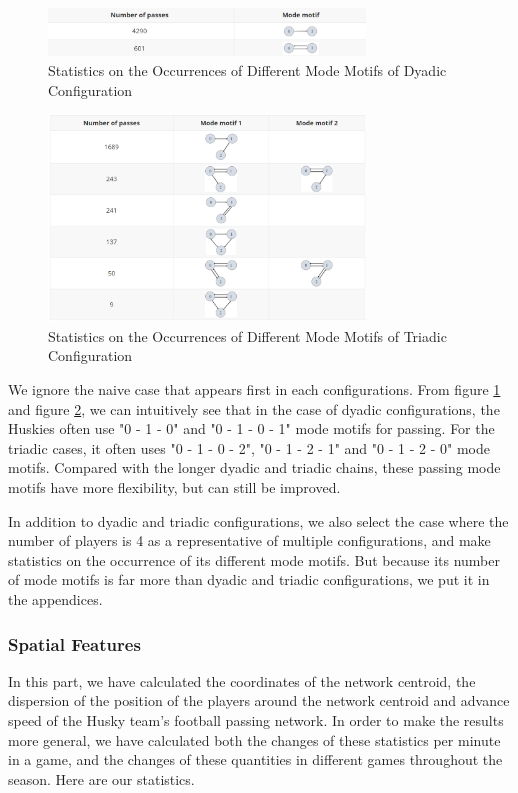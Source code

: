 \documentclass{mcmthesis}
\begin{document}
	\begin{figure}[h]
		\centering
		\includegraphics[width=0.75\textwidth]{figures/motif2.png}
		\caption{Statistics on the Occurrences of Different Mode Motifs of Dyadic Configuration}
		\label{fig:motif2}
	\end{figure}
	\begin{figure}[h]
		\centering
		\includegraphics[width=0.75\textwidth]{figures/motif3.png}
		\caption{Statistics on the Occurrences of Different Mode Motifs of Triadic Configuration}
		\label{fig:motif3}
	\end{figure}
	
	We ignore the naive case that appears first in each configurations.  From figure \ref{fig:motif2} and figure \ref{fig:motif3}, we can intuitively see that in the case of dyadic configurations, the Huskies often use "0 - 1 - 0" and "0 - 1 - 0 - 1" mode motifs for passing.  For the triadic cases, it often uses "0 - 1 - 0 - 2", "0 - 1 - 2 - 1" and "0 - 1 - 2 - 0" mode motifs.  Compared with the longer dyadic and triadic chains, these passing mode motifs have more flexibility, but  can still be improved.

	In addition to dyadic and triadic configurations, we also select the case where the number of players is 4 as a representative of multiple configurations, and make statistics on the occurrence of its different mode motifs.  But because its number of mode motifs is far more than dyadic and triadic configurations, we put it in the appendices.
\subsubsection{Spatial Features}
	In this part, we have calculated the coordinates of the network centroid, the dispersion of the position of the players around the network centroid and advance speed of the Husky team's football passing network.  In order to make the results more general, we have calculated both the changes of these statistics per minute in a game, and the changes of these quantities in different games throughout the season.  Here are our statistics.
\end{document}
